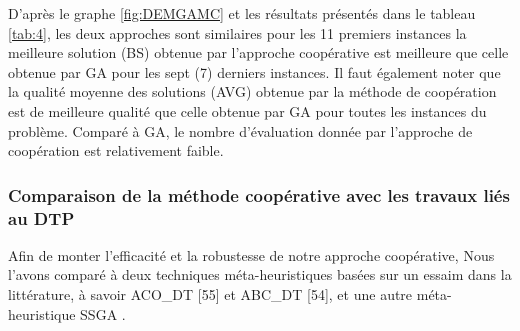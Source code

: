 \begin{enumerate}[label=\alph*)]
D’après le graphe \ref{fig:DEMGAMC} et les résultats présentés dans le tableau \ref{tab:4}, les deux approches sont similaires pour les 11 premiers instances la meilleure solution (BS) obtenue par l’approche coopérative  est meilleure que celle obtenue par GA pour les sept  (7) derniers instances. Il faut également noter que la qualité moyenne des solutions (AVG) obtenue par la méthode de coopération est de meilleure qualité que celle obtenue par GA pour toutes les instances du problème. Comparé à GA, le nombre d’évaluation donnée par  l’approche de coopération est relativement faible.

\end{enumerate}


\subsubsection{Comparaison de la méthode coopérative avec les travaux liés au DTP}
Afin de monter l’efficacité et la robustesse de notre approche coopérative, Nous l’avons comparé à deux techniques méta-heuristiques basées sur un essaim dans la littérature, à savoir ACO\_DT [55] et ABC\_DT [54], et une autre méta-heuristique SSGA \cite{sundar2014steady} .

